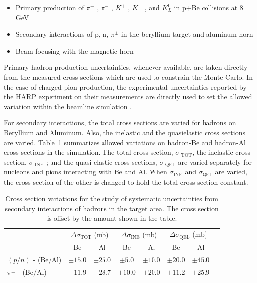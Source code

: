 \begin{itemize}
\item Primary production of $\pi^+$ , $\pi^-$ , $K^+$ , $K^−$ , and $K_L^0$ in p+Be collisions at 8 GeV
\item Secondary interactions of p, n, $\pi^{\pm}$ in the beryllium target and aluminum horn
\item Beam focusing with the magnetic horn
\end{itemize}

Primary hadron production uncertainties, whenever available, are taken directly from the
measured cross sections which are used to constrain the Monte Carlo. In the case
of charged pion production, the experimental uncertainties reported by the HARP experiment on
their measurements are directly used to set the allowed variation within the beamline simulation \cite{Catanesi:2007ab}.

For secondary interactions, the total cross sections are varied for hadrons on Beryllium and Aluminum.  Also, the inelastic and the quasielastic cross sections are varied.  Table~\ref{tab:flux_secondary_int_variations} summarizes allowed variations on hadron-Be and hadron-Al cross sections in the simulation. The total cross section, $\sigma_{\text{~TOT}}$, the inelastic cross section, $\sigma_{\text{~INE}}$ ; and the quasi-elastic cross sections, $\sigma_{\text{~QEL}}$ are varied separately for nucleons and pions interacting with Be and Al. When $\sigma_{\text{INE}}$ and $\sigma_{\text{QEL}}$ are varied, the cross section of the other is changed to hold the total cross section constant.

\begin{table}[h]
  \caption{Cross section variations for the study of systematic uncertainties from secondary interactions of hadrons in the target area.  The cross section is offset by the amount shown in the table.}
  \label{tab:flux_secondary_int_variations}
  \centering
  \begin{tabular}{l|ccccccc}
  \hline
  \hline
   &  \multicolumn{2}{c}{$\Delta \sigma_{\text{TOT}}$ (mb)} & \multicolumn{2}{c}{$\Delta \sigma_{\text{INE}}$ (mb)} & \multicolumn{2}{c}{$\Delta \sigma_{\text{QEL}}$ (mb)} \\
   &  Be & Al & Be & Al & Be & Al \\
  \hline
   $(p/n)$ - (Be/Al) & $\pm 15.0$ & $\pm 25.0$ & $\pm 5.0$ & $\pm 10.0$ & $\pm 20.0$ & $\pm 45.0$ \\
   $\pi^{\pm}$ - (Be/Al) & $\pm 11.9$ & $\pm 28.7$ & $\pm 10.0$ & $\pm 20.0$ & $\pm 11.2$ & $\pm 25.9$ \\
  \hline
  \end{tabular}
\end{table}

